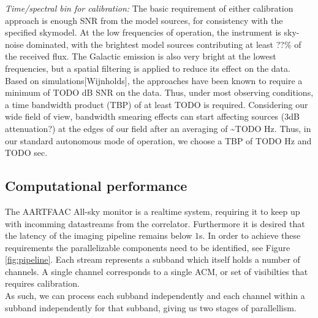 \documentclass{aa}
\begin{document}
\emph{Time/spectral  bin  for  calibration:  }The basic  requirement  of  either
calibration approach is enough SNR  from the model sources, for consistency with
the specified skymodel.  At the low frequencies of  operation, the instrument is
sky-noise dominated, with the brightest model sources contributing at least ??\%
of the  received flux. The Galactic emission  is also very bright  at the lowest
frequencies, but  a spatial  filtering is  applied to reduce  its effect  on the
data.  Based on simulations{[}Wijnholds{]},  the approaches  have been  known to
require  a minimum  of  TODO dB  SNR on  the  data. Thus,  under most  observing
conditions,   a   time  bandwidth   product   (TBP)   of   at  least   TODO   is
required. Considering  our wide  field of view,  bandwidth smearing  effects can
start affecting  sources (3dB attenuation?) at  the edges of our  field after an
averaging of \textasciitilde{}TODO Hz. Thus,  in our standard autonomous mode of
operation, we choose a TBP of TODO Hz and TODO sec.


\subsection{\label{sub:Computational-performance}Computational performance}
The AARTFAAC All-sky monitor is a realtime system, requiring it to keep up with
incomming datastreams from the correlator. Furthermore it is desired that the
latency of the imaging pipeline remains below $1$s. In order to achieve these
requirements the parallelizable components need to be identified, see Figure
\ref{fig:pipeline}. Each stream represents a subband which itself holds a
number of channels. A single channel corresponds to a single ACM, or set of
visibilties that requires calibration. \\ 
As such, we can process each subband independently and each channel within a
subband independently for that subband, giving us two stages of parallellism.
\end{document}

